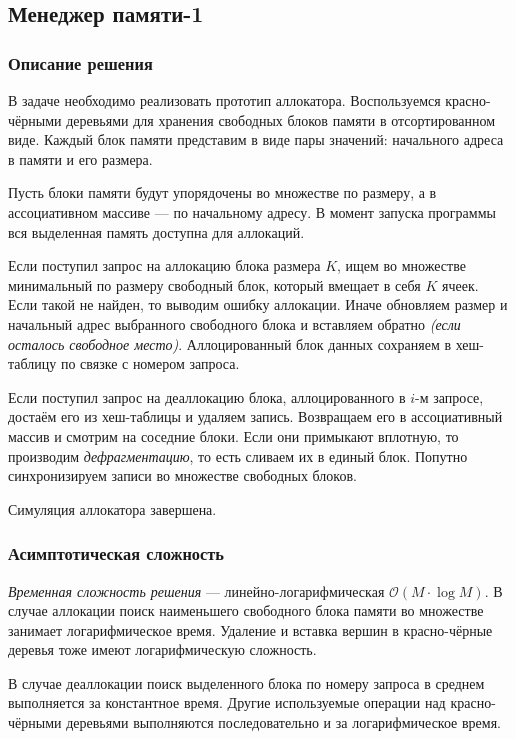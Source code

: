\subsection{Менеджер памяти-1}

\subsubsection{Описание решения}

В задаче необходимо реализовать прототип аллокатора. Воспользуемся красно-чёрными деревьями для хранения свободных блоков памяти в отсортированном виде. Каждый блок памяти представим в виде пары значений: начального адреса в памяти и его размера.

Пусть блоки памяти будут упорядочены во множестве по размеру, а в ассоциативном массиве --- по начальному адресу. В момент запуска программы вся выделенная память доступна для аллокаций.

Если поступил запрос на аллокацию блока размера \( K \), ищем во множестве минимальный по размеру свободный блок, который вмещает в себя \( K \) ячеек. Если такой не найден, то выводим ошибку аллокации. Иначе обновляем размер и начальный адрес выбранного свободного блока и вставляем обратно \textit{(если осталось свободное место)}. Аллоцированный блок данных сохраняем в хеш-таблицу по связке с номером запроса.

Если поступил запрос на деаллокацию блока, аллоцированного в \( i \)-м запросе, достаём его из хеш-таблицы и удаляем запись. Возвращаем его в ассоциативный массив и смотрим на соседние блоки. Если они примыкают вплотную, то производим \textit{дефрагментацию}, то есть сливаем их в единый блок. Попутно синхронизируем записи во множестве свободных блоков.

Симуляция аллокатора завершена.

\subsubsection{Асимптотическая сложность}

\textit{Временная сложность решения} --- линейно-логарифмическая \( \mathcal{O}(M\cdot\log M) \). В случае аллокации поиск наименьшего свободного блока памяти во множестве занимает логарифмическое время. Удаление и вставка вершин в красно-чёрные деревья тоже имеют логарифмическую сложность.

В случае деаллокации поиск выделенного блока по номеру запроса в среднем выполняется за константное время. Другие используемые операции над красно-чёрными деревьями выполняются последовательно и за логарифмическое время.

